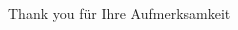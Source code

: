 \STANDARD{}
{
  \begin{columns}
    \begin{column}{0.35\textwidth}
      \begin{block}{~~~~~~Thank you}
        \centering
        für Ihre Aufmerksamkeit
      \end{block}
    \end{column}
  \end{columns}
}



